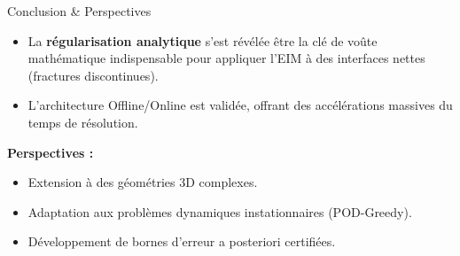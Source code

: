 \documentclass[aspectratio=169]{beamer}
\begin{document}
\begin{frame}{Conclusion \& Perspectives}
\begin{itemize}
    \item La \textbf{régularisation analytique} s'est révélée être la clé de voûte mathématique indispensable pour appliquer l'EIM à des interfaces nettes (fractures discontinues).
    \item L'architecture Offline/Online est validée, offrant des accélérations massives du temps de résolution.
\end{itemize}

\vspace{0.5cm}
\textbf{Perspectives :}
\begin{itemize}
    \item Extension à des géométries 3D complexes.
    \item Adaptation aux problèmes dynamiques instationnaires (POD-Greedy).
    \item Développement de bornes d'erreur a posteriori certifiées.
\end{itemize}

\end{frame}
\end{document}
